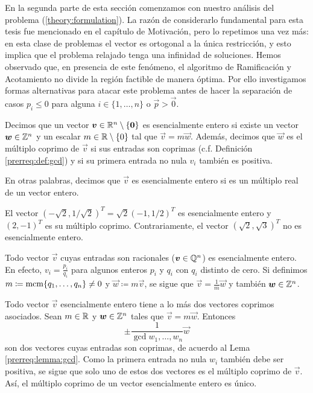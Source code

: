 En la segunda parte de esta sección comenzamos con nuestro análisis del problema
(\ref{theory:formulation}). La razón de considerarlo fundamental para esta tesis fue mencionado en
el capítulo de Motivación, pero lo repetimos una vez más: en esta clase de problemas el vector es
ortogonal a la única restricción, y esto implica que el problema relajado tenga una infinidad de
soluciones. Hemos observado que, en presencia de este fenómeno, el algoritmo de Ramificación y
Acotamiento no divide la región factible de manera óptima. Por ello investigamos formas alternativas
para atacar este problema antes de hacer la separación de casos $p_i \leq 0$ para alguna $i \in
\lbrace 1, \ldots, n \rbrace$ o $\vec{p} > \vec{0}$.
\begin{definition}
	\label{theory:def:rational}
	Decimos que un vector $\boldsymbol{v} \in \mathbb{R}^n \setminus \lbrace \boldsymbol{0} \rbrace$ es esencialmente
	entero si existe un vector $\boldsymbol{w} \in \mathbb{Z}^n$ y un escalar $m \in \mathbb{R} \setminus \lbrace 0
	\rbrace$ tal que $\vec{v} = m\vec{w}$. Además, decimos que $\vec{w}$ es el múltiplo coprimo de
	$\vec{v}$ si sus entradas son coprimas (c.f. Definición \ref{prerreq:def:gcd}) y si su primera
	entrada no nula $v_i$ también es positiva.
\end{definition}
En otras palabras, decimos que $\vec{v}$ es esencialmente entero si es un múltiplo real de un vector
entero.
\begin{example}
	El vector $\left(-\sqrt{2}, 1/\sqrt{2}\right)^T = \sqrt{2}(-1, 1/2)^T$ es esencialmente entero
	y $(2, -1)^T$ es su múltiplo coprimo. Contrariamente, el vector $(\sqrt{2}, \sqrt{3})^T$ no es
	esencialmente entero.
\end{example}
\begin{observation}
	Todo vector $\vec{v}$ cuyas entradas son racionales ($\boldsymbol{v} \in \mathbb{Q}^n$) es esencialmente
	entero. En efecto, $v_i = \frac{p_i}{q_i}$ para algunos enteros $p_i$ y $q_i$ con $q_i$
	distinto de cero. Si definimos $m \coloneq \mathop{\mathrm{mcm}{\left\lbrace q_1, \ldots, q_n \right\rbrace}} \neq 0$ y $\vec{w} \coloneq
	m\vec{v}$, se sigue que $\vec{v} = \frac{1}{m}\vec{w}$ y también $\boldsymbol{w} \in \mathbb{Z}^n$.
\end{observation}
\begin{observation}
	Todo vector $\vec{v}$ esencialmente entero tiene a lo más dos vectores coprimos asociados. Sean
	$m \in \mathbb{R}$ y $\boldsymbol{w} \in \mathbb{Z}^n$ tales que $\vec{v} = m\vec{w}$. Entonces
	\begin{equation*}
		\pm \frac{1}{\gcd{w_1, \ldots, w_n}}\vec{w}
	\end{equation*}
	son dos vectores cuyas entradas son coprimas, de acuerdo al Lema \ref{prerreq:lemma:gcd}. Como
	la primera entrada no nula $w_i$ también debe ser positiva, se sigue que solo uno de estos dos
	vectores es el múltiplo coprimo de $\vec{v}$. Así, el múltiplo coprimo de un vector
	esencialmente entero es único.
\end{observation}

